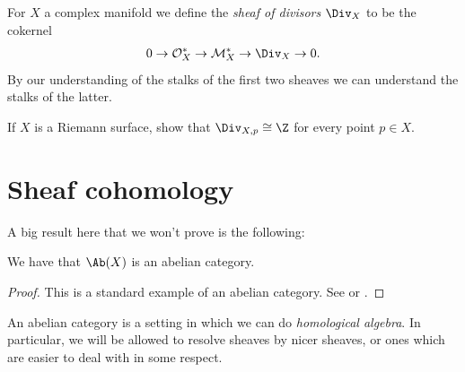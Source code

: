 \documentclass[11pt]{book}
\begin{document}
\begin{example} For $X$ a complex manifold we define the \emph{sheaf of divisors} $\Div_X$ to be the cokernel
\begin{align*}
    0 \to \mathcal{O}_X^\ast \to \mathcal{M}_X^\ast \to \Div_X \to 0.
\end{align*}
By our understanding of the stalks of the first two sheaves we can understand the stalks of the latter.
\end{example}

\begin{exercise} If $X$ is a Riemann surface, show that $\Div_{X,p} \cong \Z$ for every point $p\in X$.
\end{exercise}

\section{Sheaf cohomology}
A big result here that we won't prove is the following:

\begin{theorem} We have that $\Ab(X)$ is an abelian category.
\end{theorem}
\begin{proof} This is a standard example of an abelian category. See \cite[II\S2]{godementTopologieAlgebriqueTheorie1958} or \cite{Tohoku}.
\end{proof}

An abelian category is a setting in which we can do \emph{homological algebra}. In particular, we will be allowed to resolve sheaves by nicer sheaves, or ones which are easier to deal with in some respect.

\end{document}

